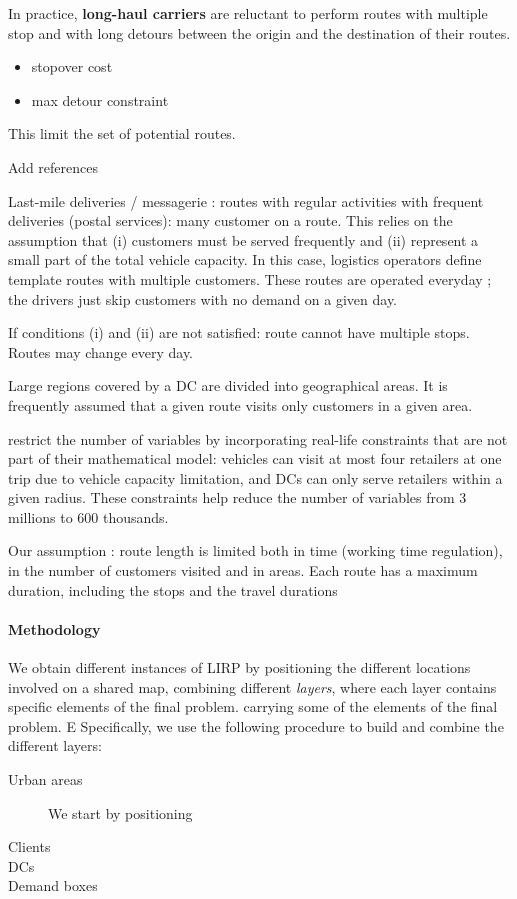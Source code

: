\documentclass[a4paper,10pt]{article}
\begin{document}
\begin{linenumbers}
In practice, \textbf{long-haul carriers} are reluctant to perform routes with multiple stop and with long detours between the origin and the destination of their routes. 

\begin{itemize}
	\item stopover cost
	\item max detour constraint
\end{itemize}
This limit the set of potential routes. 

Add references 

Last-mile deliveries / messagerie : routes with regular activities with frequent deliveries (postal services): many customer on a route. This relies on the assumption that (i) customers must be served frequently and (ii) represent a small part of the total vehicle capacity. In this case, logistics operators define template routes with multiple customers. These routes are operated everyday ; the drivers just skip customers with no demand on a given day. 

If conditions (i) and (ii) are not satisfied: route cannot have multiple stops. Routes may change every day. 

Large regions covered by a DC are divided into geographical areas. It is frequently assumed that a given route visits only customers in a given area.


\cite{Zheng2019} restrict the number of variables by incorporating real-life constraints that are not part of their mathematical model: vehicles can visit at most four retailers at one trip due to vehicle capacity limitation, and DCs can only serve retailers within a given radius. These constraints help reduce the number of variables from 3 millions to 600 thousands.

Our assumption : route length is limited both in time (working time regulation), in the number of customers visited and in areas.   Each route has a maximum duration, including the stops and the travel durations



\paragraph{Methodology}
We obtain different instances of LIRP by positioning the different locations involved on a shared map, combining different {\em layers}, where each layer contains specific elements of the final problem.
carrying some of the elements of the final problem.
E
Specifically, we use the following procedure to build and combine the different layers:
\begin{description}
    \item[Urban areas] We start by positioning
    \item[Clients]
    \item[DCs]
    \item[Demand boxes]
\end{description}




\end{linenumbers}
\end{document}
